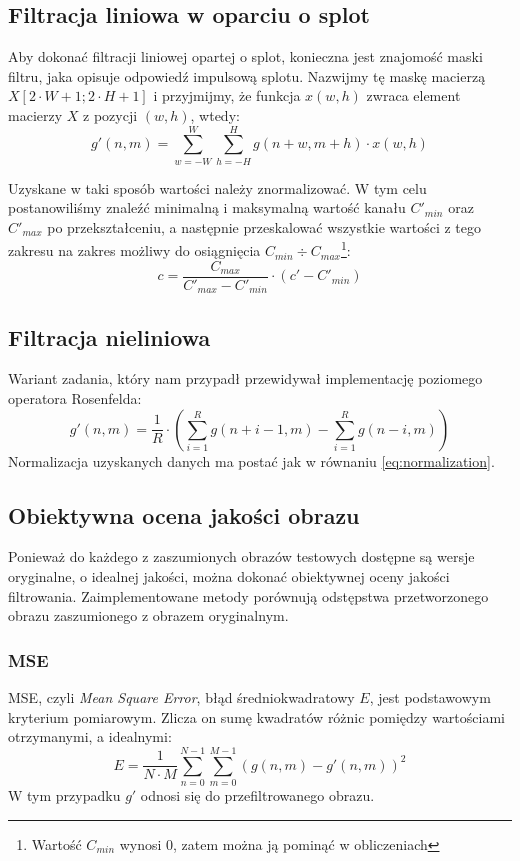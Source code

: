 \documentclass{classrep}
\begin{document}
\subsection{Filtracja liniowa w oparciu o splot}
Aby dokonać filtracji liniowej opartej o splot, konieczna jest znajomość maski filtru, jaka opisuje odpowiedź impulsową splotu. Nazwijmy tę maskę macierzą $X[2 \cdot W + 1; 2 \cdot H + 1]$ i przyjmijmy, że funkcja $x(w, h)$ zwraca element macierzy $X$ z pozycji $(w, h)$, wtedy:
\begin{equation}
 g'(n, m) = \displaystyle \sum \limits_{w=-W}^W \displaystyle \sum \limits_{h=-H}^H g(n + w, m + h) \cdot x(w, h)
\end{equation}

Uzyskane w taki sposób wartości należy znormalizować. W tym celu postanowiliśmy znaleźć minimalną i maksymalną wartość kanału $C'_{min}$ oraz $C'_{max}$ po przekształceniu, a następnie przeskalować wszystkie wartości z tego zakresu na zakres możliwy do osiągnięcia $C_{min} \div C_{max}$\footnote{Wartość $C_{min}$ wynosi 0, zatem można ją pominąć w obliczeniach}:
\begin{equation}
 \label{eq:normalization}
 c = \frac{C_{max}}{C'_{max} - C'_{min}} \cdot (c' - C'_{min})
\end{equation}

\subsection{Filtracja nieliniowa}
Wariant zadania, który nam przypadł przewidywał implementację poziomego operatora Rosenfelda:
\begin{equation}
 g'(n, m) = \frac{1}{R} \cdot \left( \displaystyle \sum \limits_{i=1}^R g\left(n + i - 1, m\right) - \displaystyle \sum \limits_{i=1}^R g\left(n - i, m\right) \right)
\end{equation}
Normalizacja uzyskanych danych ma postać jak w równaniu \ref{eq:normalization}.

\subsection{Obiektywna ocena jakości obrazu}
Ponieważ do każdego z zaszumionych obrazów testowych dostępne są wersje oryginalne, o idealnej jakości, można dokonać obiektywnej oceny jakości filtrowania. Zaimplementowane metody porównują odstępstwa przetworzonego obrazu zaszumionego z obrazem oryginalnym.

\subsubsection{MSE}
MSE, czyli \textit{Mean Square Error}, błąd średniokwadratowy $E$, jest podstawowym kryterium pomiarowym. Zlicza on sumę kwadratów różnic pomiędzy wartościami otrzymanymi, a idealnymi:
\begin{equation}
 E = \frac{1}{N \cdot M} \displaystyle \sum \limits_{n=0}^{N-1} \sum \limits_{m=0}^{M-1} \left(g\left(n, m\right) - g'\left(n, m\right) \right)^2
\end{equation}
W tym przypadku $g'$ odnosi się do przefiltrowanego obrazu.
\end{document}
